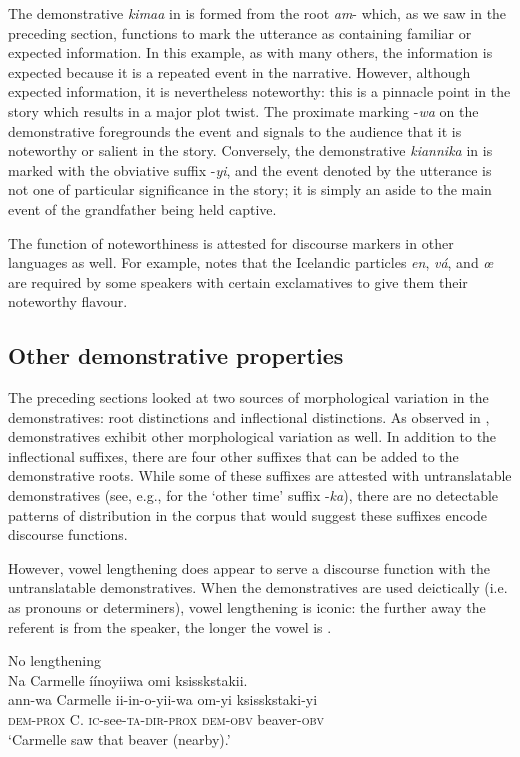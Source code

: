 \documentclass[output=paper,colorlinks,citecolor=brown]{langscibook}
\begin{document}
The demonstrative \textit{kimaa} in  is formed from the root \textit{am}- which, as we saw in the preceding section, functions to mark the utterance as containing familiar or expected information. In this example, as with many others, the information is expected because it is a repeated event in the narrative. However, although expected information, it is nevertheless noteworthy: this is a pinnacle point in the story which results in a major plot twist. The proximate marking -\textit{wa} on the demonstrative foregrounds the event and signals to the audience that it is noteworthy or salient in the story. Conversely, the demonstrative \textit{kiannika} in  is marked with the obviative suffix -\textit{yi}, and the event denoted by the utterance is not one of particular significance in the story; it is simply an aside to the main event of the grandfather being held captive. 

The function of noteworthiness is attested for discourse markers in other languages as well. For example, \citet{Jónsson2017} notes that the Icelandic particles \textit{en}, \textit{vá}, and \textit{œ} are required by some speakers with certain exclamatives to give them their noteworthy flavour. 

\subsection{Other demonstrative properties}\label{sec:bliss:4.4}

The preceding sections looked at two sources of morphological variation in the demonstratives: root distinctions and inflectional distinctions. As observed in , demonstratives exhibit other morphological variation as well. In addition to the inflectional suffixes, there are four other suffixes that can be added to the demonstrative roots. While some of these suffixes are attested with untranslatable demonstratives (see, e.g.,  for the ‘other time’ suffix -\textit{ka}), there are no detectable patterns of distribution in the corpus that would suggest these suffixes encode discourse functions. 

However, vowel lengthening does appear to serve a discourse function with the untranslatable demonstratives. When the demonstratives are used deictically (i.e. as pronouns or determiners), vowel lengthening is iconic: the further away the referent is from the speaker, the longer the vowel is .

\ea\label{ex:bliss:17}
\ea No lengthening\\
  Na Carmelle íínoyiiwa omi ksisskstakii.\\
\gll  ann-wa Carmelle ii-in-o-yii-wa om-yi ksisskstaki-yi \\
     \textsc{dem-prox} C. \textsc{ic}-see-\textsc{ta-dir-prox} \textsc{dem-obv} beaver-\textsc{obv}\\
\glt ‘Carmelle saw that beaver (nearby).’
\end{document}
